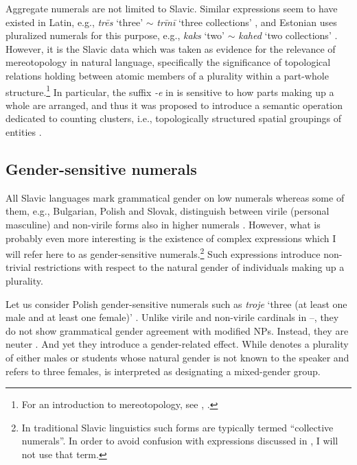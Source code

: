 \documentclass[output=paper]{langscibook}
\begin{document}
\noindent Aggregate numerals are not limited to Slavic. Similar expressions seem to have existed in Latin, e.g., \textit{trēs} `three' $\sim$ \textit{trīnī} `three collections' \citep{ojeda1997semantics}, and Estonian uses pluralized numerals for this purpose, e.g., \textit{kaks} `two' $\sim$ \textit{kahed} `two collections' \citep{norris2018morphosyntax}. However, it is the Slavic data which was taken as evidence for the relevance of mereotopology in natural language, specifically the significance of topological relations holding between atomic members of a plurality within a part-whole structure.\footnote{For an introduction to mereotopology, see \cite[Ch. 4]{grimm2012number}, \cite[Ch. 6]{wagiel2018subatomic}.} In particular, the suffix \textit{-e} in  is sensitive to how parts making up a whole are arranged, and thus it was proposed to introduce a semantic operation dedicated to counting clusters, i.e., topologically structured spatial groupings of entities \citep{grimm_docekal2021counting}.

	\subsection{Gender-sensitive numerals}\label{sec:gender-sensitive-numerals}
	
	All Slavic languages mark grammatical gender on low numerals whereas some of them, e.g., Bulgarian, Polish and Slovak, distinguish between virile (personal masculine) and non-virile forms also in higher numerals \citep{cinque-krapova2007note,pancheva2018how,wagiel2023grammatical}. However, what is probably even more interesting is the existence of complex expressions which I will refer here to as gender-sensitive numerals.\footnote{In traditional Slavic linguistics such forms are typically termed ``collective numerals''. In order to avoid confusion with expressions discussed in , I will not use that term.} Such expressions introduce non-trivial restrictions with respect to the natural gender of individuals making up a plurality.
	
	Let us consider Polish gender-sensitive numerals such as \textit{troje} `three (at least one male and at least one female)' \citep{wagiel2014boys,wagiel2015sums}. Unlike virile and non-virile cardinals in --, they do not show grammatical gender agreement with modified NPs. Instead, they are neuter . And yet they introduce a gender-related effect. While  denotes a plurality of either males or students whose natural gender is not known to the speaker and  refers to three females,  is interpreted as designating a mixed-gender group.
\end{document}
